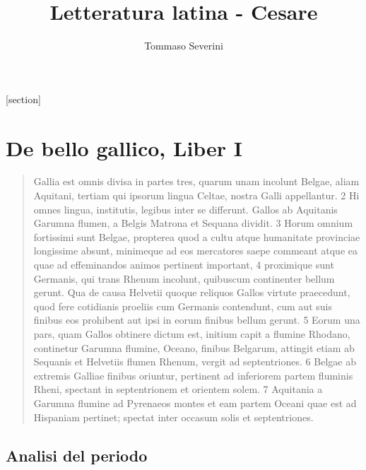 \documentclass[10pt,a4paper]{article}
\author{Tommaso Severini}
\title{Letteratura latina - Cesare}
\begin{document}
	\maketitle
	
	[section]
	
	\section{De bello gallico, Liber I}
		
	\begin{quote}
		Gallia est omnis divisa in partes tres, quarum unam incolunt Belgae, aliam Aquitani, tertiam qui ipsorum lingua Celtae, nostra Galli appellantur. 2 Hi omnes lingua, institutis, legibus inter se differunt. Gallos ab Aquitanis Garumna flumen, a Belgis Matrona et Sequana dividit. 3 Horum omnium fortissimi sunt Belgae, propterea quod a cultu atque humanitate provinciae longissime absunt, minimeque ad eos mercatores saepe commeant atque ea quae ad effeminandos animos pertinent important, 4 proximique sunt Germanis, qui trans Rhenum incolunt, quibuscum continenter bellum gerunt. Qua de causa Helvetii quoque reliquos Gallos virtute praecedunt, quod fere cotidianis proeliis cum Germanis contendunt, cum aut suis finibus eos prohibent aut ipsi in eorum finibus bellum gerunt. 5 Eorum una pars, quam Gallos obtinere dictum est, initium capit a flumine Rhodano, continetur Garumna flumine, Oceano, finibus Belgarum, attingit etiam ab Sequanis et Helvetiis flumen Rhenum, vergit ad septentriones. 6 Belgae ab extremis Galliae finibus oriuntur, pertinent ad inferiorem partem fluminis Rheni, spectant in septentrionem et orientem solem. 7 Aquitania a Garumna flumine ad Pyrenaeos montes et eam partem Oceani quae est ad Hispaniam pertinet; spectat inter occasum solis et septentriones.
	\end{quote}

	\subsection{Analisi del periodo}
	
\end{document}
